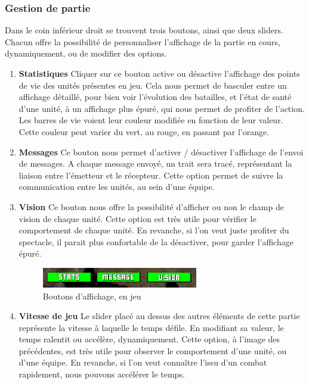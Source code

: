 \documentclass{report}
\begin{document}
\subsubsection{Gestion de partie}
Dans le coin inférieur droit se trouvent trois boutons, ainsi que deux sliders.
Chacun offre la possibilité de personnaliser l'affichage de la partie en cours, dynamiquement, ou de modifier des options.
\begin{enumerate}
\item\textbf{Statistiques}
Cliquer sur ce bouton active ou désactive l'affichage des points de vie des unités présentes en jeu. Cela nous permet de basculer entre un affichage détaillé, pour bien voir l'évolution des batailles, et l'état de santé d'une unité, à un affichage plus épuré, qui nous permet de profiter de l'action.\newline
Les barres de vie voient leur couleur modifiée en fonction de leur valeur. Cette couleur peut varier du vert, au rouge, en passant par l'orange.

\item\textbf{Messages}
Ce bouton nous permet d'activer / désactiver l'affichage de l'envoi de messages. A chaque message envoyé, un trait sera tracé, représentant la liaison entre l'émetteur et le récepteur. Cette option permet de suivre la communication entre les unités, au sein d'une équipe.

\item\textbf{Vision}
Ce bouton nous offre la possibilité d'afficher ou non le champ de vision de chaque unité. Cette option est très utile pour vérifier le comportement de chaque unité.\newline
En revanche, si l'on veut juste profiter du spectacle, il parait plus confortable de la désactiver, pour garder l'affichage épuré.

\begin{figure}[h]
	\centering
		\includegraphics[scale=1]{OptionButtons}
	\caption{Boutons d'affichage, en jeu}
\end{figure}

\item\textbf{Vitesse de jeu}
Le slider placé au dessus des autres éléments de cette partie représente la vitesse à laquelle le temps défile. En modifiant sa valeur, le temps ralentit ou accélère, dynamiquement. Cette option, à l'image des précédentes, est très utile pour observer le comportement d'une unité, ou d'une équipe.
En revanche, si l'on veut connaître l'issu d'un combat rapidement, nous pouvons accélérer le temps.


\end{enumerate}
\end{document}
